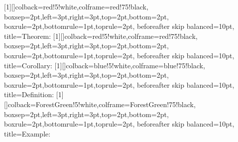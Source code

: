 

{}[1][]{colback=red!5!white,colframe=red!75!black,%
	boxsep=2pt,left=3pt,right=3pt,top=2pt,bottom=2pt,%
	boxrule=2pt,bottomrule=1pt,toprule=2pt,%
	beforeafter skip balanced=10pt,%
	title=Theorem: }
[1][]{colback=red!5!white,colframe=red!75!black,%
	boxsep=2pt,left=3pt,right=3pt,top=2pt,bottom=2pt,%
	boxrule=2pt,bottomrule=1pt,toprule=2pt,%
	beforeafter skip balanced=10pt,%
	title=Corollary:  } %
[1][]{colback=blue!5!white,colframe=blue!75!black,%
	boxsep=2pt,left=3pt,right=3pt,top=2pt,bottom=2pt,%
	boxrule=2pt,bottomrule=1pt,toprule=2pt,%
	beforeafter skip balanced=10pt,%
	title=Definition:  }
[1][]{colback=ForestGreen!5!white,colframe=ForestGreen!75!black,%
	boxsep=2pt,left=3pt,right=3pt,top=2pt,bottom=2pt,%
	boxrule=2pt,bottomrule=1pt,toprule=2pt,%
	beforeafter skip balanced=10pt,%
	title=Example: 	}
	
